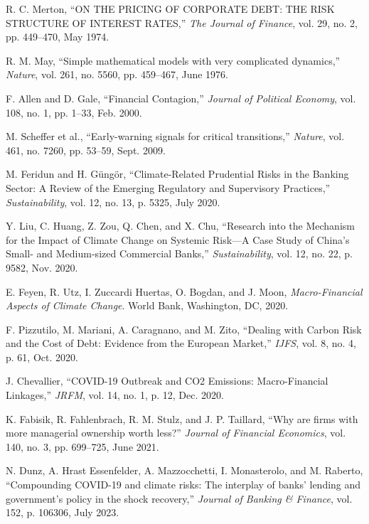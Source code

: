 \documentclass[conference]{IEEEtran}
\begin{document}
\begin{thebibliography}{00}
 R. C. Merton, ``ON THE PRICING OF CORPORATE DEBT: THE RISK STRUCTURE OF INTEREST RATES,'' \textit{The Journal of Finance}, vol. 29, no. 2, pp. 449--470, May 1974.

 R. M. May, ``Simple mathematical models with very complicated dynamics,'' \textit{Nature}, vol. 261, no. 5560, pp. 459--467, June 1976.

 F. Allen and D. Gale, ``Financial Contagion,'' \textit{Journal of Political Economy}, vol. 108, no. 1, pp. 1--33, Feb. 2000.

 M. Scheffer et al., ``Early-warning signals for critical transitions,'' \textit{Nature}, vol. 461, no. 7260, pp. 53--59, Sept. 2009.

 M. Feridun and H. Güngör, ``Climate-Related Prudential Risks in the Banking Sector: A Review of the Emerging Regulatory and Supervisory Practices,'' \textit{Sustainability}, vol. 12, no. 13, p. 5325, July 2020.

 Y. Liu, C. Huang, Z. Zou, Q. Chen, and X. Chu, ``Research into the Mechanism for the Impact of Climate Change on Systemic Risk—A Case Study of China's Small- and Medium-sized Commercial Banks,'' \textit{Sustainability}, vol. 12, no. 22, p. 9582, Nov. 2020.

 E. Feyen, R. Utz, I. Zuccardi Huertas, O. Bogdan, and J. Moon, \textit{Macro-Financial Aspects of Climate Change}. World Bank, Washington, DC, 2020.

 F. Pizzutilo, M. Mariani, A. Caragnano, and M. Zito, ``Dealing with Carbon Risk and the Cost of Debt: Evidence from the European Market,'' \textit{IJFS}, vol. 8, no. 4, p. 61, Oct. 2020.

 J. Chevallier, ``COVID-19 Outbreak and CO2 Emissions: Macro-Financial Linkages,'' \textit{JRFM}, vol. 14, no. 1, p. 12, Dec. 2020.

 K. Fabisik, R. Fahlenbrach, R. M. Stulz, and J. P. Taillard, ``Why are firms with more managerial ownership worth less?'' \textit{Journal of Financial Economics}, vol. 140, no. 3, pp. 699--725, June 2021.

 N. Dunz, A. Hrast Essenfelder, A. Mazzocchetti, I. Monasterolo, and M. Raberto, ``Compounding COVID-19 and climate risks: The interplay of banks' lending and government's policy in the shock recovery,'' \textit{Journal of Banking \& Finance}, vol. 152, p. 106306, July 2023.


\end{thebibliography}
\end{document}

